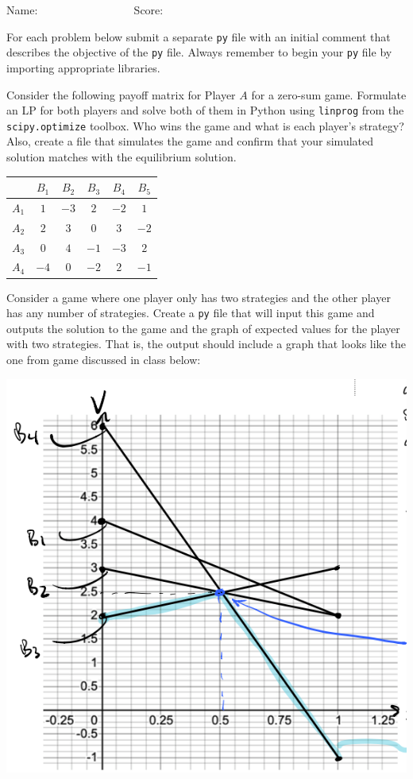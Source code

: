 \documentclass[10pt]{article}
\begin{document}
\vspace{2cm}
\flushright Name: $\qquad \qquad \qquad \qquad $
\flushright Score: $\qquad \qquad \qquad \qquad $

\pagebreak







\flushleft
For each problem below submit a separate \texttt{py} file with an initial comment that describes the objective of the \texttt{py} file.  Always remember to begin your \texttt{py} file by importing appropriate libraries.  

\begin{enumerate}[{$\qquad 1.]$}]

\item Consider the following payoff matrix for Player $A$ for a zero-sum game.  Formulate an LP for both players and solve both of them in Python using \texttt{linprog} from the \texttt{scipy.optimize} toolbox.  Who wins the game and what is each player's strategy?  Also, create a file that simulates the game and confirm that your simulated solution matches with the equilibrium solution.   

\begin{center}
\hspace{-2cm}
\begin{tabular}{l | c c c c c  |}
& $B_1$ & $B_2$  & $B_3$ & $B_4$ & $B_5$  \\ \hline
$A_1$ & $1$ & $-3$ & $2$ & $-2$ & $1$\\
$A_2$ & $2$ & $3$ & $0$ & $3$ & $-2$ \\ 
$A_3$ & $0$ & $4$ & $-1$ & $-3$ & $2$ \\
$A_4$ & $-4$ & $0$ & $-2$ & $2$ & $-1$ \\\hline
\end{tabular}
\end{center}


\item Consider a game where one player only has two strategies and the other player has any number of strategies.  Create a \texttt{py} file that will input this game and outputs the solution to the game and the graph of expected values for the player with two strategies.  That is, the output should include a graph that looks like the one from game discussed in class below: 

\begin{center}
	\includegraphics[width = .35\textwidth]{Example_Graph.png}
\end{center}


\end{enumerate}
\end{document}
